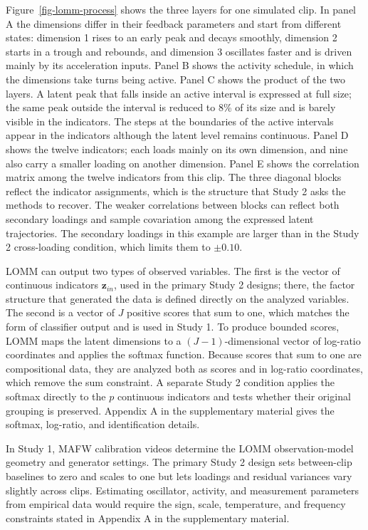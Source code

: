 \documentclass[
]{article}
\begin{document}
Figure~\ref{fig-lomm-process} shows the three layers for one simulated
clip. In panel A the dimensions differ in their feedback parameters and
start from different states: dimension 1 rises to an early peak and
decays smoothly, dimension 2 starts in a trough and rebounds, and
dimension 3 oscillates faster and is driven mainly by its acceleration
inputs. Panel B shows the activity schedule, in which the dimensions
take turns being active. Panel C shows the product of the two layers. A
latent peak that falls inside an active interval is expressed at full
size; the same peak outside the interval is reduced to 8\% of its size
and is barely visible in the indicators. The steps at the boundaries of
the active intervals appear in the indicators although the latent level
remains continuous. Panel D shows the twelve indicators; each loads
mainly on its own dimension, and nine also carry a smaller loading on
another dimension. Panel E shows the correlation matrix among the twelve
indicators from this clip. The three diagonal blocks reflect the
indicator assignments, which is the structure that Study 2 asks the
methods to recover. The weaker correlations between blocks can reflect
both secondary loadings and sample covariation among the expressed
latent trajectories. The secondary loadings in this example are larger
than in the Study 2 cross-loading condition, which limits them to
\(\pm 0.10\).

LOMM can output two types of observed variables. The first is the vector
of continuous indicators \(\mathbf z_{in}\), used in the primary Study 2
designs; there, the factor structure that generated the data is defined
directly on the analyzed variables. The second is a vector of \(J\)
positive scores that sum to one, which matches the form of classifier
output and is used in Study 1. To produce bounded scores, LOMM maps the
latent dimensions to a \((J-1)\)-dimensional vector of log-ratio
coordinates and applies the softmax function. Because scores that sum to
one are compositional data, they are analyzed both as scores and in
log-ratio coordinates, which remove the sum constraint. A separate Study
2 condition applies the softmax directly to the \(p\) continuous
indicators and tests whether their original grouping is preserved.
Appendix A in the supplementary material gives the softmax, log-ratio,
and identification details.

In Study 1, MAFW calibration videos determine the LOMM observation-model
geometry and generator settings. The primary Study 2 design sets
between-clip baselines to zero and scales to one but lets loadings and
residual variances vary slightly across clips. Estimating oscillator,
activity, and measurement parameters from empirical data would require
the sign, scale, temperature, and frequency constraints stated in
Appendix A in the supplementary material.
\end{document}
